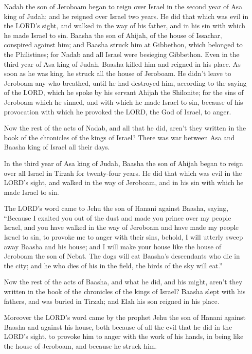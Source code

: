 \myverse{}Nadab the son of Jeroboam began to reign over Israel in the
second year of Asa king of Judah; and he reigned over Israel two years.
\myverse{}He did that which was evil in the LORD’s sight, and walked in the way of
his father, and in his sin with which he made Israel to sin.
\myverse{}Baasha the son of Ahijah, of the house of Issachar, conspired against him;
and Baasha struck him at Gibbethon, which belonged to the Philistines; for Nadab and all Israel were besieging
Gibbethon.
\myverse{}Even in the third year of Asa king of Judah, Baasha killed him and reigned
in his place.
\myverse{}As soon as he was king, he struck all the house of Jeroboam. He didn’t leave
to Jeroboam any who breathed, until he had destroyed him, according to the saying of the LORD, which he
spoke by his servant Ahijah the Shilonite;
\myverse{}for the sins of Jeroboam which he sinned, and with which he made Israel to
sin, because of his provocation with which he provoked the LORD, the God of Israel, to anger.

\myverse{}Now the rest of the acts of Nadab, and all that he did, aren’t
they written in the book of the chronicles of the kings of Israel?
\myverse{}There was war between Asa and Baasha king of Israel all their days.

\myverse{}In the third year of Asa king of Judah, Baasha the son of Ahijah
began to reign over all Israel in Tirzah for twenty-four years.
\myverse{}He did that which was evil in the LORD’s sight, and walked in the way of
Jeroboam, and in his sin with which he made Israel to sin.


\mychapter{} \myverse*{}The LORD’s word came to Jehu the son of Hanani against Baasha,
saying,
\myverse{}“Because I exalted you out of the dust and made you prince over my people Israel,
and you have walked in the way of Jeroboam and have made my people Israel to sin, to provoke me to anger
with their sins,
\myverse{}behold, I will utterly sweep away Baasha and his house; and I will make your
house like the house of Jeroboam the son of Nebat.
\myverse{}The dogs will eat Baasha’s descendants who die in the city; and he who dies
of his in the field, the birds of the sky will eat.”

\myverse{}Now the rest of the acts of Baasha, and what he did, and his might,
aren’t they written in the book of the chronicles of the kings of Israel?
\myverse{}Baasha slept with his fathers, and was buried in Tirzah; and Elah his son reigned
in his place.

\myverse{}Moreover the LORD’s word came by the prophet Jehu the son of Hanani
against Baasha and against his house, both because of all the evil that he did in the LORD’s sight, to
provoke him to anger with the work of his hands, in being like the house of Jeroboam, and because he struck
him.

